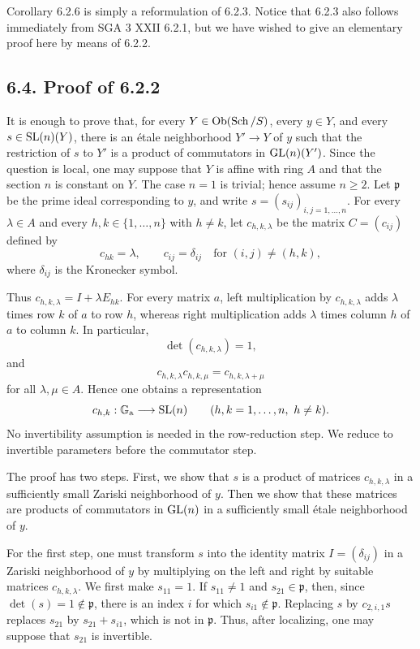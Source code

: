 Corollary 6.2.6 is simply a reformulation of 6.2.3. Notice that 6.2.3 also
follows immediately from SGA 3 XXII 6.2.1, but we have wished to give an
elementary proof here by means of 6.2.2.

\subsection*{6.4. Proof of 6.2.2}
It is enough to prove that, for every $Y\in\operatorname{Ob}(\operatorname{Sch}/S)$, every $y\in Y$,
and every $s\in\operatorname{SL}(n)(Y)$, there is an \'etale neighborhood $Y'\to Y$ of
$y$ such that the restriction of $s$ to $Y'$ is a product of commutators
in $\operatorname{GL}(n)(Y')$. Since the question is local, one may suppose that $Y$ is
affine with ring $A$ and that the section $n$ is constant on $Y$. The case
$n=1$ is trivial; hence assume $n\geq2$. Let
$\mathfrak p$ be the prime ideal corresponding to $y$, and write
$s=(s_{ij})_{i,j=1,\ldots,n}$. For every $\lambda\in A$ and every
$h,k\in\{1,\ldots,n\}$ with $h\ne k$, let $c_{h,k,\lambda}$ be the matrix
$C=(c_{ij})$ defined by
\[
c_{hk}=\lambda,\qquad
c_{ij}=\delta_{ij}\quad\text{for }(i,j)\ne(h,k),
\]
where $\delta_{ij}$ is the Kronecker symbol.

Thus $c_{h,k,\lambda}=I+\lambda E_{hk}$. For every matrix $a$, left
multiplication by $c_{h,k,\lambda}$ adds $\lambda$ times row $k$ of $a$ to
row $h$, whereas right multiplication adds $\lambda$ times column $h$ of
$a$ to column $k$. In particular,
\[
\det(c_{h,k,\lambda})=1,
\]
and
\begin{equation}\tag{6.3.1}
c_{h,k,\lambda}c_{h,k,\mu}=c_{h,k,\lambda+\mu}
\end{equation}
for all $\lambda,\mu\in A$. Hence one obtains a representation
\[
c_{h,k}:\mathbb G_{\mathrm a}\longrightarrow\operatorname{SL}(n)
\qquad(h,k=1,\ldots,n,\ h\ne k).
\]
No invertibility assumption is needed in the row-reduction step. We reduce
to invertible parameters before the commutator step.

The proof has two steps. First, we show that $s$ is a product of matrices
$c_{h,k,\lambda}$ in a sufficiently small Zariski neighborhood of $y$.
Then we show that these matrices are products of commutators in $\operatorname{GL}(n)$ in
a sufficiently small \'etale neighborhood of $y$.

For the first step, one must transform $s$ into the identity matrix
$I=(\delta_{ij})$ in a Zariski neighborhood of $y$ by multiplying on the
left and right by suitable matrices $c_{h,k,\lambda}$. We first make
$s_{11}=1$. If $s_{11}\ne1$ and $s_{21}\in\mathfrak p$, then, since
$\det(s)=1\notin\mathfrak p$, there is an index $i$ for which
$s_{i1}\notin\mathfrak p$. Replacing $s$ by $c_{2,i,1}s$ replaces
$s_{21}$ by $s_{21}+s_{i1}$, which is not in $\mathfrak p$. Thus, after
localizing, one may suppose that $s_{21}$ is invertible.

